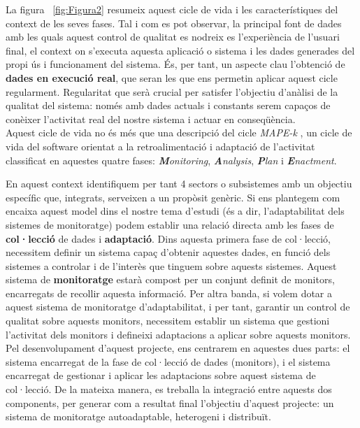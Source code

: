 La figura ~\ref{fig:Figura2} resumeix aquest cicle de vida i les característiques del context de les seves fases. Tal i com es pot observar, la principal font de dades amb les quals aquest control de qualitat es nodreix es l'experiència de l'usuari final, el context on s'executa aquesta aplicació o sistema i les dades generades del propi ús i funcionament del sistema. És, per tant, un aspecte clau l'obtenció de \textbf{dades en execució real}, que seran les que ens permetin aplicar aquest cicle regularment. Regularitat que serà crucial per satisfer l'objectiu d'anàlisi de la qualitat del sistema: només amb dades actuals i constants serem capaços de conèixer l'activitat real del nostre sistema i actuar en conseqüència.\\

Aquest cicle de vida no és més que una descripció del cicle \textit{MAPE-k} \cite{mapek1}\cite{mapek2}, un cicle de vida del software orientat a la retroalimentació i adaptació de l'activitat classificat en aquestes quatre fases: \textit{\textbf{M}onitoring}, \textit{\textbf{A}nalysis}, \textit{\textbf{P}lan} i \textit{\textbf{E}nactment}.

En aquest context identifiquem per tant 4 sectors o subsistemes amb un objectiu específic que, integrats, serveixen a un propòsit genèric. Si ens plantegem com encaixa aquest model dins el nostre tema d'estudi (és a dir, l'adaptabilitat dels sistemes de monitoratge) podem establir una relació directa amb les fases de \textbf{col·lecció} de dades i \textbf{adaptació}. Dins aquesta primera fase de col·lecció, necessitem definir un sistema capaç d'obtenir aquestes dades, en funció dels sistemes a controlar i de l'interès que tinguem sobre aquests sistemes. Aquest sistema de \textbf{monitoratge} estarà compost per un conjunt definit de monitors, encarregats de recollir aquesta informació. Per altra banda, si volem dotar a aquest sistema de monitoratge d'adaptabilitat, i per tant, garantir un control de qualitat sobre aquests monitors, necessitem establir un sistema que gestioni l'activitat dels monitors i defineixi adaptacions a aplicar sobre aquests monitors.\\

Pel desenvolupament d'aquest projecte, ens centrarem en aquestes dues parts: el sistema encarregat de la fase de col·lecció de dades (monitors), i el sistema encarregat de gestionar i aplicar les adaptacions sobre aquest sistema de col·lecció. De la mateixa manera, es treballa la integració entre aquests dos components, per generar com a resultat final l'objectiu d'aquest projecte: un sistema de monitoratge autoadaptable, heterogeni i distribuït.